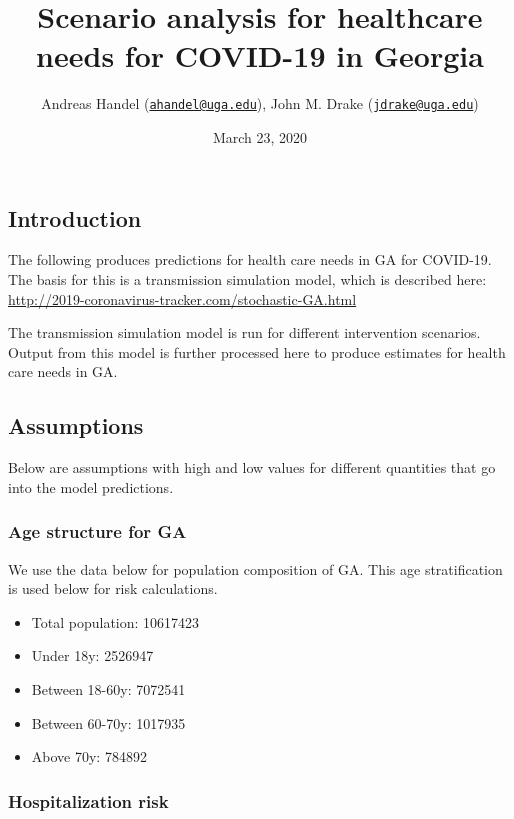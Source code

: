 \documentclass[
]{article}
\title{Scenario analysis for healthcare needs for COVID-19 in Georgia}
\author{Andreas Handel
(\href{mailto:ahandel@uga.edu}{\nolinkurl{ahandel@uga.edu}}), John M.
Drake (\href{mailto:jdrake@uga.edu}{\nolinkurl{jdrake@uga.edu}})}
\date{March 23, 2020}
\providecommand{\tightlist}{%
  \setlength{\itemsep}{0pt}\setlength{\parskip}{0pt}}
\begin{document}
\maketitle

\hypertarget{introduction}{%
\subsection{Introduction}\label{introduction}}

The following produces predictions for health care needs in GA for
COVID-19. The basis for this is a transmission simulation model, which
is described here:
\url{http://2019-coronavirus-tracker.com/stochastic-GA.html}

The transmission simulation model is run for different intervention
scenarios. Output from this model is further processed here to produce
estimates for health care needs in GA.

\hypertarget{assumptions}{%
\subsection{Assumptions}\label{assumptions}}

Below are assumptions with high and low values for different quantities
that go into the model predictions.

\hypertarget{age-structure-for-ga}{%
\subsubsection{Age structure for GA}\label{age-structure-for-ga}}

We use the data below for population composition of GA. This age
stratification is used below for risk calculations.

\begin{itemize}
\tightlist
\item
  Total population: 10617423
\item
  Under 18y: 2526947
\item
  Between 18-60y: 7072541
\item
  Between 60-70y: 1017935
\item
  Above 70y: 784892
\end{itemize}

\hypertarget{hospitalization-risk}{%
\subsubsection{Hospitalization risk}\label{hospitalization-risk}}
\end{document}
